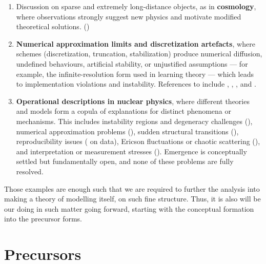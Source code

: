 \begin{enumerate}[leftmargin=0.5cm,topsep=1pt,itemsep=1pt]
\item[(7)] Discussion on sparse and extremely long-distance objects, as in \textbf{cosmology}, where observations strongly suggest new physics and motivate modified theoretical solutions. (\cite{Zwicky1933,Rubin1970,Riess1998,Perlmutter1999})

\item[(8)] \textbf{Numerical approximation limits and discretization artefacts}, where schemes (discretization, truncation, stabilization) produce numerical diffusion, undefined behaviours, artificial stability, or unjustified assumptions — for example, the infinite-resolution form used in learning theory — which leads to implementation violations and instability. References to include \cite{StrangFix1973,Trefethen2000,Hairer1993,LeVeque2002}, \cite{Higham2002,Wilkinson1963,Roache1998,Oberkampf2002,SanchezStern2017,Lam2010}, \cite{Zitko2009,Hu2012,Menard2021}, and \cite{Coveney2020}.

\item[(9)] \textbf{Operational descriptions in nuclear physics}, where different theories and models form a copula of explanations for distinct phenomena or mechanisms. This includes instability regions and degeneracy challenges (\cite{Otsuka2005,Warburton1990,Thielemann2017,Mumpower2016}), numerical approximation problems (\cite{Furnstahl2015,Mumpower2016}), sudden structural transitions (\cite{Iachello2001,Casten2000}), reproducibility issues (\cite{Leeb2008} on \cite{EXFOR} data), Ericson fluctuations or chaotic scattering (\cite{Ericson1960,Bohigas1984}), and interpretation or measurement stresses (\cite{Ericson1960,HauserFeshbach1952}). Emergence is conceptually settled but fundamentally open, and none of these problems are fully resolved.
\end{enumerate}
Those examples are enough such that we are required to further the analysis into making a theory of modelling itself, on such fine structure. Thus, it is also will be our doing in such matter going forward, starting with the conceptual formation into the precursor forms. 
\section{Precursors}

